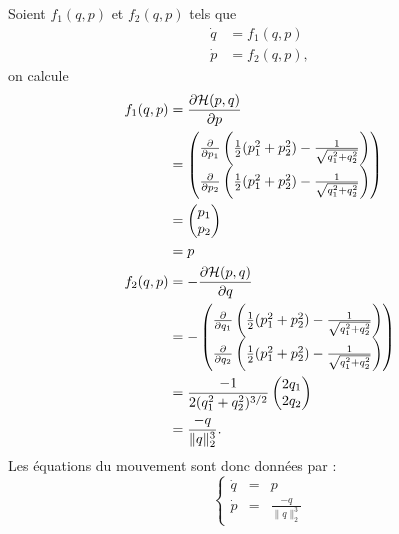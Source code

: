 Soient $f_1(q,p)$ et $f_2(q,p)$ tels que
\begin{align*}
  \dot{q} & = f_1(q,p)\\
  \dot{p} & = f_2(q,p),
\end{align*}
on calcule
\begin{align*}
  f_1(q,p) & =  \fpart{\Ha (p,q)}{p}\\
  & =
  \begin{pmatrix}
    \fpart{}{p_1} \left(\frac{1}{2}(p_1^2 + p_2^2) - \frac{1}{\sqrt{q_1^2 + q_2^2}}\right)\\
    \fpart{}{p_2} \left(\frac{1}{2}(p_1^2 + p_2^2) - \frac{1}{\sqrt{q_1^2 + q_2^2}}\right)
  \end{pmatrix}\\
  & =
  \begin{pmatrix}
    p_1\\
    p_2
  \end{pmatrix}\\
  & = p\\
%
  f_2(q,p) & =  -\fpart{\Ha (p,q)}{q}\\
  & =
  -\begin{pmatrix}
    \fpart{}{q_1} \left(\frac{1}{2}(p_1^2 + p_2^2) - \frac{1}{\sqrt{q_1^2 + q_2^2}}\right)\\
    \fpart{}{q_2} \left(\frac{1}{2}(p_1^2 + p_2^2) - \frac{1}{\sqrt{q_1^2 + q_2^2}}\right)
  \end{pmatrix}\\
  & =
  \frac{-1}{2(q_1^2 + q_2^2)^{3/2}}
  \begin{pmatrix}
    2q_1\\
    2q_2
  \end{pmatrix}\\
  & = \frac{-q}{\|q\|_2^3}.
\end{align*}
Les équations du mouvement sont donc données par : 
\begin{equation} \label{equation_mvt}
\left\lbrace
\begin{array}{ccc} 
\dot{q} &=& p\\
\dot{p} &=&  \frac{-q}{\|q\|_2^3}
\end{array}
\right.
\end{equation}


